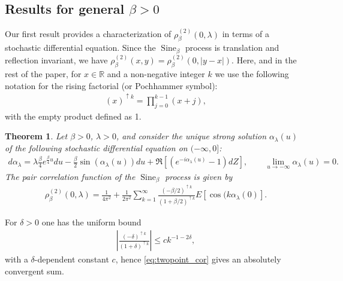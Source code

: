 \documentclass[12pt]{article}
\newtheorem{theorem}{Theorem}
\theoremstyle{definition} %
\newcommand{\R}{{\mathbb R}}
\theoremstyle{remark} %
\newcommand{\Sineb}{\operatorname{Sine}_{\beta}}
\begin{document}
\subsection*{Results for general $\beta>0$}

Our first result provides a characterization of $\rho^{(2)}_\beta(0,\lambda)$ in terms of a stochastic differential equation. Since the $\Sineb$ process  is translation and reflection invariant, we have $\rho^{(2)}_\beta(x,y)=\rho^{(2)}_\beta(0,|y-x|)$. 
Here, and in the rest of the paper, for $x\in \R$ and a non-negative integer $k$ we use the following notation for the rising factorial (or Pochhammer symbol):
\begin{align}\label{eq:Poch}
    (x)^{\uparrow k}=\prod_{j=0}^{k-1}(x+j), 
\end{align}
with the empty product defined as 1. 
\begin{theorem}\label{thm:sineb_corr}
    Let $\beta>0$, $\lambda>0$, and consider the unique strong solution $\alpha_{\lambda}(u)$ of the following stochastic differential equation on $(-\infty,0]$:
    \begin{align}
    \label{eq:alphaSDE_b}
	d\alpha_\lambda = \lambda\tfrac{\beta}{4}e^{\frac{\beta}{4}u} du -\frac{\beta}{2} \sin(\alpha_\lambda(u)) du+ \Re[(e^{-i\alpha_\lambda(u)}-1)dZ], \qquad \lim_{u\to -\infty} \alpha_\lambda(u)=0. 
\end{align}
    The  pair correlation function of the $\Sineb$ process is given by
\begin{align}\label{eq:twopoint_cor}
        \rho_\beta^{(2)}(0,\lambda)=\frac{1}{4\pi^2}+\frac{1}{2\pi^2}\sum_{k=1}^\infty  \frac{(-\beta/2)^{\uparrow k}}{(1+\beta/2)^{\uparrow k}} E[\cos(k \alpha_\lambda(0)].
    \end{align}  
\end{theorem}
For $\delta>0$ one has the uniform bound
\begin{align}
\left|\frac{(-\delta)^{\uparrow k}}{(1+ \delta)^{\uparrow k}}\right|\le c k^{-1-2  \delta},
   \label{eq:coeff_bnd} 
\end{align}
with a $\delta$-dependent  constant $c$, hence \eqref{eq:twopoint_cor} gives an absolutely convergent sum. 
\end{document}
